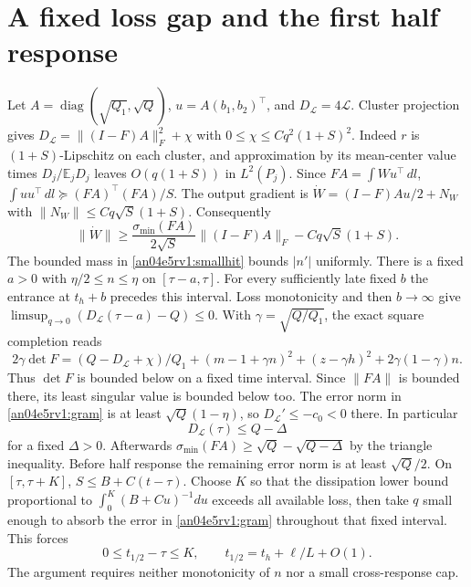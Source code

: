 \documentclass[11pt]{article}
\newcommand{\dd}{\,dl}
\newcommand{\Ll}{\mathcal L}
\newcommand{\E}{\mathbb E}
\begin{document}
\section{A fixed loss gap and the first half response}\label{an04e5rv1:half}
Let $A=\operatorname{diag}(\sqrt{Q_1},\sqrt Q)$, $u=A(b_1,b_2)^\top$, and $D_{\Ll}=4\Ll$.
Cluster projection gives $D_{\Ll}=\|(I-F)A\|_F^2+\chi$ with $0\le\chi\le Cq^2(1+S)^2$. Indeed $r$ is $(1+S)$-Lipschitz on each cluster, and approximation by its mean-center value times $D_j/\E_jD_j$ leaves $O(q(1+S))$ in $L^2(P_j)$. Since $FA=\int Wu^\top\dd$, $\int uu^\top\dd\succeq (FA)^\top(FA)/S$. The output gradient is $\dot W=(I-F)Au/2+N_W$ with $\|N_W\|\le Cq\sqrt S(1+S)$. Consequently
\begin{equation}\label{an04e5rv1:gram}
 \|\dot W\|\ge\frac{\sigma_{\min}(FA)}{2\sqrt S}\|(I-F)A\|_F-Cq\sqrt S(1+S).
\end{equation}
The bounded mass in \eqref{an04e5rv1:smallhit} bounds $|n'|$ uniformly. There is a fixed $a>0$ with $\eta/2\le n\le\eta$ on $[\tau-a,\tau]$. For every sufficiently late fixed $b$ the entrance at $t_h+b$ precedes this interval. Loss monotonicity and then $b\to\infty$ give $\limsup_{q\to0}(D_{\Ll}(\tau-a)-Q)\le0$. With $\gamma=\sqrt{Q/Q_1}$, the exact square completion reads
\[
 2\gamma\det F=(Q-D_{\Ll}+\chi)/Q_1+
 (m-1+\gamma n)^2+(z-\gamma h)^2+2\gamma(1-\gamma)n .
\]
Thus $\det F$ is bounded below on a fixed time interval. Since $\|FA\|$ is bounded there, its least singular value is bounded below too. The error norm in \eqref{an04e5rv1:gram} is at least $\sqrt Q(1-\eta)$, so $D_{\Ll}'\le-c_0<0$ there. In particular
\begin{equation}\label{an04e5rv1:gap}
 D_{\Ll}(\tau)\le Q-\Delta
\end{equation}
for a fixed $\Delta>0$. Afterwards $\sigma_{\min}(FA)\ge\sqrt Q-\sqrt{Q-\Delta}$ by the triangle inequality. Before half response the remaining error norm is at least $\sqrt Q/2$. On $[\tau,\tau+K]$, $S\le B+C(t-\tau)$. Choose $K$ so that the dissipation lower bound proportional to $\int_0^K (B+Cu)^{-1}du$ exceeds all available loss, then take $q$ small enough to absorb the error in \eqref{an04e5rv1:gram} throughout that fixed interval. This forces
\begin{equation}\label{an04e5rv1:halfclock}
 0\le t_{1/2}-\tau\le K,\qquad t_{1/2}=t_h+\ell/L+O(1).
\end{equation}
The argument requires neither monotonicity of $n$ nor a small cross-response cap.
\end{document}
